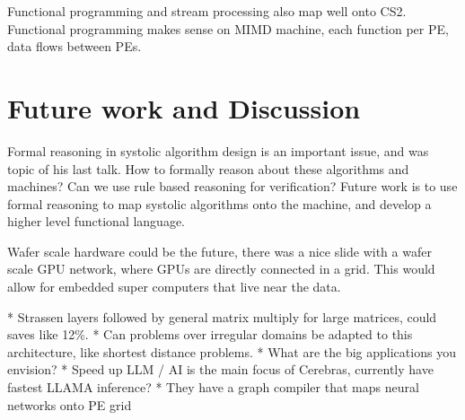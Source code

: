 \documentclass{article}
\begin{document}
Functional programming and stream processing also map well onto CS2.
Functional programming makes sense on MIMD machine, 
each function per PE, data flows between PEs.

\section{Future work and Discussion}

Formal reasoning in systolic algorithm design is an important issue, and was topic of his last talk.
How to formally reason about these algorithms and machines?
Can we use rule based reasoning for verification?
Future work is to use formal reasoning to map systolic algorithms onto the machine, 
and develop a higher level functional language.

Wafer scale hardware could be the future, there was a nice slide with a wafer scale GPU network, where GPUs are directly connected in a grid.
This would allow for embedded super computers that live near the data.

* Strassen layers followed by general matrix multiply for large matrices, could saves like 12\%.
* Can problems over irregular domains be adapted to this architecture, like shortest distance problems.
* What are the big applications you envision? 
    * Speed up LLM / AI is the main focus of Cerebras, currently have fastest LLAMA inference?
    * They have a graph compiler that maps neural networks onto PE grid

\printbibliography
\end{document}
